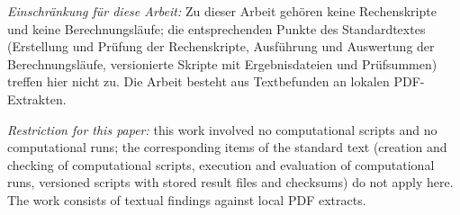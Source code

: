 \documentclass[11pt,a4paper]{article}
\theoremstyle{definition}
\begin{document}
{}


\medskip

\noindent
\emph{Einschränkung für diese Arbeit:} Zu dieser Arbeit gehören keine
Rechenskripte und keine Berechnungsläufe; die entsprechenden Punkte des
Standardtextes (Erstellung und Prüfung der Rechenskripte, Ausführung und
Auswertung der Berechnungsläufe, versionierte Skripte mit Ergebnisdateien und
Prüfsummen) treffen hier nicht zu. Die Arbeit besteht aus Textbefunden an lokalen
PDF-Extrakten.

\medskip

\noindent
\emph{Restriction for this paper:} this work involved no computational scripts and
no computational runs; the corresponding items of the standard text (creation and
checking of computational scripts, execution and evaluation of computational runs,
versioned scripts with stored result files and checksums) do not apply here. The
work consists of textual findings against local PDF extracts.
\end{document}
